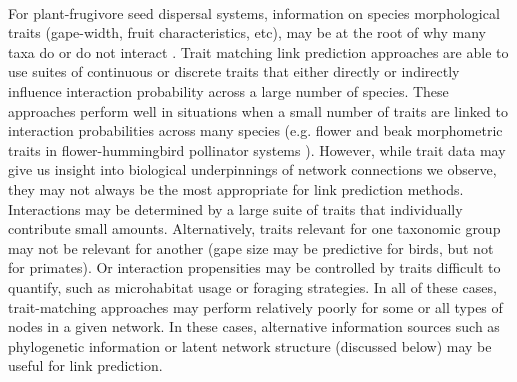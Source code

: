 \paragraph*{}
For plant-frugivore seed dispersal systems, information on species morphological traits (gape-width, fruit characteristics, etc), may be at the root of why many taxa do or do not interact \parencite{moran2010can, gonzalez2015relative, bender2018morphological}. Trait matching link prediction approaches are able to use suites of continuous or discrete traits that either directly or indirectly influence interaction probability across a large number of species. These approaches perform well in situations when a small number of traits are linked to interaction probabilities across many species (e.g. flower and beak morphometric traits in flower-hummingbird pollinator systems \parencite{pichler2020}). However, while trait data may give us insight into biological underpinnings of network connections we observe, they may not always be the most appropriate for link prediction methods. Interactions may be determined by a large suite of traits that individually contribute small amounts. Alternatively, traits relevant for one taxonomic group may not be relevant for another (gape size may be predictive for birds, but not for primates). Or interaction propensities may be controlled by traits difficult to quantify, such as microhabitat usage or foraging strategies. In all of these cases, trait-matching approaches may perform relatively poorly for some or all types of nodes in a given network. In these cases, alternative information sources such as phylogenetic information or latent network structure (discussed below) may be useful for link prediction. 

